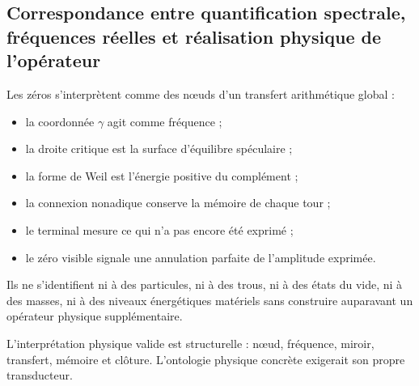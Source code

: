 \subsection{Correspondance entre quantification spectrale, fréquences réelles et réalisation physique de l'opérateur}
Les zéros s'interprètent comme des nœuds d'un transfert arithmétique global :\par
\begin{itemize}
\item la coordonnée \(\gamma\) agit comme fréquence ;
\item la droite critique est la surface d'équilibre spéculaire ;
\item la forme de Weil est l'énergie positive du complément ;
\item la connexion nonadique conserve la mémoire de chaque tour ;
\item le terminal mesure ce qui n'a pas encore été exprimé ;
\item le zéro visible signale une annulation parfaite de l'amplitude exprimée.
\end{itemize}
Ils ne s'identifient ni à des particules, ni à des trous, ni à des états du vide, ni à des masses, ni à des niveaux énergétiques matériels sans construire auparavant un opérateur physique supplémentaire.\par
L'interprétation physique valide est structurelle : nœud, fréquence, miroir, transfert, mémoire et clôture. L'ontologie physique concrète exigerait son propre transducteur.\par
{}
